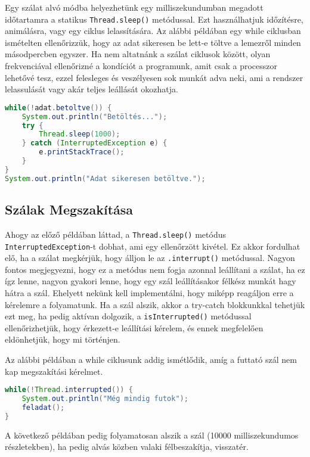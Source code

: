 \documentclass{article}
\let\l\lstinline
\begin{document}
Egy szálat alvó módba helyezhetünk egy milliszekundumban megadott időtartamra a statikus
	\l{Thread.sleep()} metódussal. Ezt használhatjuk időzítésre, animálásra, vagy egy ciklus lelassítására. Az alábbi példában egy while ciklusban ismételten ellenőrizzük, hogy az adat sikeresen be lett-e töltve a lemezről minden másodpercben egyszer. Ha nem altatnánk a szálat ciklusok között, olyan frekvenciával ellenőrizné a kondíciót a programunk, amit csak a processzor lehetővé tesz, ezzel felesleges és veszélyesen sok munkát adva neki, ami a rendszer lelassulását vagy akár teljes leállását okozhatja.

	\begin{lstlisting}[language=Java, caption=Szál altatása ciklusok között]
while(!adat.betoltve()) {
    System.out.println("Betöltés...");
 	try {
		Thread.sleep(1000);
	} catch (InterruptedException e) {
		e.printStackTrace();
	}
}
System.out.println("Adat sikeresen betöltve.");
	\end{lstlisting}

	\subsection{Szálak Megszakítása}

Ahogy az előző példában láttad, a \l{Thread.sleep()} metódus \l{InterruptedException}-t dobhat, ami egy ellenőrzött kivétel. Ez akkor fordulhat elő, ha a szálat megkérjük, hogy álljon le az \l{.interrupt()} metódussal. Nagyon fontos megjegyezni, hogy ez a metódus nem fogja azonnal leállítani a szálat, ha ez ígz lenne, nagyon gyakori lenne, hogy egy szál leállításakor félkész munkát hagy hátra a szál. Ehelyett nekünk kell implementálni, hogy miképp reagáljon erre a kérelemre a folyamatunk. Ha a szál alszik, akkor a try-catch blokkunkkal tehetjük ezt meg, ha pedig aktívan dolgozik, a \l{isInterrupted()} metódussal ellenőrizhetjük, hogy érkezett-e leállítási kérelem, és ennek megfelelően eldönhetjük, hogy mi történjen.

Az alábbi példában a while ciklusunk addig ismétlődik, amíg a futtató szál nem kap megszakítási kérelmet.

\begin{lstlisting}[language=Java, caption=Szál futtatása megszakításig]
while(!Thread.interrupted()) {
	System.out.println("Még mindig futok");
	feladat();
}
\end{lstlisting}

	\newpage

A következő példában pedig folyamatosan alszik a szál (10000 milliszekundumos részletekben), ha pedig alvás közben valaki félbeszakítja, visszatér.
\end{document}
